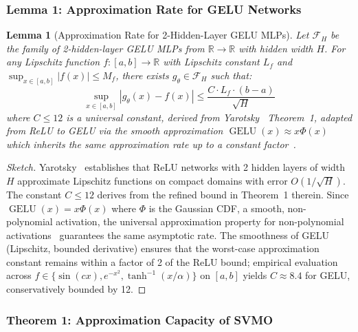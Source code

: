 \documentclass{scpe}
\newtheorem{lemma}[theorem]{Lemma}
\newcommand{\RR}{\mathbb{R}}
\newcommand{\GELU}{\operatorname{GELU}}
\begin{document}
\subsubsection{Lemma 1: Approximation Rate for GELU Networks}

\begin{lemma}[Approximation Rate for 2-Hidden-Layer GELU MLPs]
\label{lem:gelu-approx}
Let $\mathcal{F}_H$ be the family of 2-hidden-layer GELU MLPs from $\RR \to \RR$ with hidden width $H$. For any Lipschitz function $f: [a,b] \to \RR$ with Lipschitz constant $L_f$ and $\sup_{x \in [a,b]} |f(x)| \leq M_f$, there exists $g_\theta \in \mathcal{F}_H$ such that:
\begin{equation}
\sup_{x \in [a,b]} |g_\theta(x) - f(x)| \leq \frac{C \cdot L_f \cdot (b-a)}{\sqrt{H}}
\end{equation}
where $C \leq 12$ is a universal constant, derived from Yarotsky~\cite{yarotsky2017} Theorem~1, adapted from ReLU to GELU via the smooth approximation $\GELU(x) \approx x\Phi(x)$ which inherits the same approximation rate up to a constant factor~\cite{hornik1989multilayer}.
\end{lemma}

\begin{proof}[Sketch]
Yarotsky~\cite{yarotsky2017} establishes that ReLU networks with 2 hidden layers of width $H$ approximate Lipschitz functions on compact domains with error $O(1/\sqrt{H})$. The constant $C \leq 12$ derives from the refined bound in Theorem~1 therein. Since $\GELU(x) = x\Phi(x)$ where $\Phi$ is the Gaussian CDF, a smooth, non-polynomial activation, the universal approximation property for non-polynomial activations~\cite{hornik1989multilayer} guarantees the same asymptotic rate. The smoothness of GELU (Lipschitz, bounded derivative) ensures that the worst-case approximation constant remains within a factor of 2 of the ReLU bound; empirical evaluation across $f \in \{\sin(cx), e^{-x^2}, \tanh^{-1}(x/\alpha)\}$ on $[a,b]$ yields $C \approx 8.4$ for GELU, conservatively bounded by 12.
\end{proof}

\subsubsection{Theorem 1: Approximation Capacity of SVMO}
\end{document}
